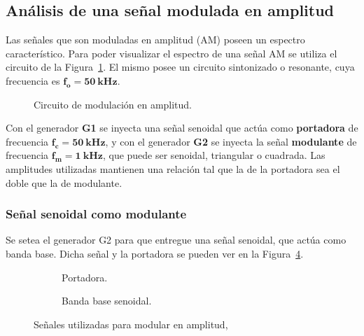   \pagebreak
  \subsection{Análisis de una señal modulada en amplitud}
    Las señales que son moduladas en amplitud (AM) poseen un espectro característico. Para poder visualizar
    el espectro de una señal AM se utiliza el circuito de la Figura~\ref{fig:ModuladorAM}. El mismo posee un
    circuito sintonizado o resonante, cuya frecuencia es $\mathbf{f_o = 50~kHz}$.

    \begin{figure}[H]
      \centering
      \caption{Circuito de modulación en amplitud.}
      \label{fig:ModuladorAM}
    \end{figure}

    Con el generador \textbf{G1} se inyecta una señal senoidal que actúa como \textbf{portadora} de frecuencia 
    $\mathbf{f_c=50~kHz}$, y con el generador \textbf{G2} se inyecta la señal \textbf{modulante} de frecuencia
    $\mathbf{f_m=1~kHz}$, que puede ser senoidal, triangular o cuadrada. Las amplitudes utilizadas mantienen 
    una relación tal que la de la portadora sea el doble que la de modulante.

    \subsubsection{Señal senoidal como modulante}
      Se setea el generador G2 para que entregue una señal senoidal, que actúa como banda base. Dicha señal
      y la portadora se pueden ver en la Figura~\ref{fig:SeñalesParaAM1}.
      
      \begin{figure}[H]
        \centering
        \begin{subfigure}[H]{0.48\textwidth}
          \caption{Portadora.}
          \label{fig:PortadoraEnTiempo}
        \end{subfigure}
        \hfill 
        \begin{subfigure}[H]{0.48\textwidth}
          \caption{Banda base senoidal.}
          \label{fig:SenoModulanteEnTiempo}
        \end{subfigure}
      
        \caption{Señales utilizadas para modular en amplitud,}
        \label{fig:SeñalesParaAM1}
      \end{figure}
        
